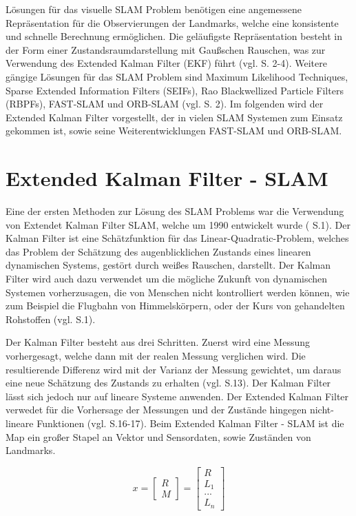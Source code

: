Lösungen für das visuelle SLAM Problem benötigen eine angemessene Repräsentation für die Observierungen der Landmarks, welche eine konsistente und schnelle Berechnung ermöglichen. Die geläufigste Repräsentation besteht in der Form einer Zustandsraumdarstellung mit Gaußschen Rauschen, was zur Verwendung des \glqq Extended Kalman Filter\grqq{} (EKF) führt (vgl. \cite{slam} S. 2-4). Weitere gängige Lösungen für das SLAM Problem sind \glqq Maximum Likelihood Techniques\grqq{}, \glqq Sparse Extended Information Filters\grqq{} (SEIFs), \glqq Rao Blackwellized Particle Filters\grqq{} (RBPFs), \glqq FAST-SLAM\grqq{} und \glqq ORB-SLAM\grqq{} (vgl. \cite{rao} S. 2). Im folgenden wird der Extended Kalman Filter vorgestellt, der in vielen SLAM Systemen zum Einsatz gekommen ist, sowie seine Weiterentwicklungen FAST-SLAM und ORB-SLAM.
  
 

\section{Extended Kalman Filter - SLAM}
Eine der ersten Methoden zur Lösung des SLAM Problems war die Verwendung von Extendet Kalman Filter SLAM, welche um 1990 entwickelt wurde (\cite{orb_slam} S.1). Der Kalman Filter ist eine Schätzfunktion für das \glqq Linear-Quadratic-Problem\grqq{}, welches das Problem der Schätzung des augenblicklichen Zustands eines linearen dynamischen Systems, gestört durch weißes Rauschen, darstellt. Der Kalman Filter wird auch dazu verwendet um die mögliche Zukunft von dynamischen Systemen vorherzusagen, die von Menschen nicht kontrolliert werden können, wie zum Beispiel die Flugbahn von Himmelskörpern, oder der Kurs von gehandelten Rohstoffen (vgl. \cite{ekf} S.1).

Der Kalman Filter besteht aus drei Schritten. Zuerst wird eine Messung vorhergesagt, welche dann mit der realen Messung verglichen wird. Die resultierende Differenz wird mit der Varianz der Messung gewichtet, um daraus eine neue Schätzung des Zustands zu erhalten (vgl. \cite{slam_studi} S.13). Der Kalman Filter lässt sich jedoch nur auf lineare Systeme anwenden. Der Extended Kalman Filter verwedet für die Vorhersage der Messungen und der Zustände hingegen nicht-lineare Funktionen (vgl. \cite{slam_studi} S.16-17). Beim Extended Kalman Filter - SLAM ist die Map ein großer Stapel an Vektor und Sensordaten, sowie Zuständen von Landmarks.

\begin{equation}
  x =  \begin{bmatrix}
		R\\
		M
     	\end{bmatrix}
     = \begin{bmatrix}
		R\\
		L_1\\
		...\\
		L_n
     	\end{bmatrix}
\end{equation}

